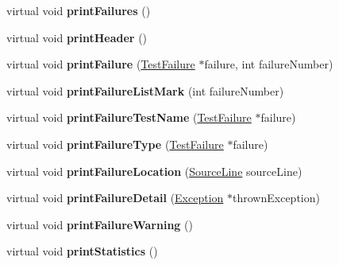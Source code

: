 \begin{DoxyCompactItemize}
\item 
\hypertarget{class_text_outputter_a4c1413e4ce39317c18e3eed577dd208b}{virtual void {\bfseries print\+Failures} ()}\label{class_text_outputter_a4c1413e4ce39317c18e3eed577dd208b}

\item 
\hypertarget{class_text_outputter_a3d80efeb41c0401372536b362358dc45}{virtual void {\bfseries print\+Header} ()}\label{class_text_outputter_a3d80efeb41c0401372536b362358dc45}

\item 
\hypertarget{class_text_outputter_af2f2271d5795c6be4f7a47e255554a69}{virtual void {\bfseries print\+Failure} (\hyperlink{class_test_failure}{Test\+Failure} $\ast$failure, int failure\+Number)}\label{class_text_outputter_af2f2271d5795c6be4f7a47e255554a69}

\item 
\hypertarget{class_text_outputter_a029d1e203df4e3f426eb9685062683bc}{virtual void {\bfseries print\+Failure\+List\+Mark} (int failure\+Number)}\label{class_text_outputter_a029d1e203df4e3f426eb9685062683bc}

\item 
\hypertarget{class_text_outputter_a200849dff27b10844d117029576b17ac}{virtual void {\bfseries print\+Failure\+Test\+Name} (\hyperlink{class_test_failure}{Test\+Failure} $\ast$failure)}\label{class_text_outputter_a200849dff27b10844d117029576b17ac}

\item 
\hypertarget{class_text_outputter_a95c601c6a903700450d95e13db502247}{virtual void {\bfseries print\+Failure\+Type} (\hyperlink{class_test_failure}{Test\+Failure} $\ast$failure)}\label{class_text_outputter_a95c601c6a903700450d95e13db502247}

\item 
\hypertarget{class_text_outputter_a5ba7ad1968b180ce9593373718632af9}{virtual void {\bfseries print\+Failure\+Location} (\hyperlink{class_source_line}{Source\+Line} source\+Line)}\label{class_text_outputter_a5ba7ad1968b180ce9593373718632af9}

\item 
\hypertarget{class_text_outputter_ae1a2ad2deebf4b12f803c59d867980f7}{virtual void {\bfseries print\+Failure\+Detail} (\hyperlink{class_exception}{Exception} $\ast$thrown\+Exception)}\label{class_text_outputter_ae1a2ad2deebf4b12f803c59d867980f7}

\item 
\hypertarget{class_text_outputter_a254f58361b8f5c59b60df1c007d9a438}{virtual void {\bfseries print\+Failure\+Warning} ()}\label{class_text_outputter_a254f58361b8f5c59b60df1c007d9a438}

\item 
\hypertarget{class_text_outputter_aeabfe5420c137b0a935c5b0acb45a6d8}{virtual void {\bfseries print\+Statistics} ()}\label{class_text_outputter_aeabfe5420c137b0a935c5b0acb45a6d8}

\end{DoxyCompactItemize}
